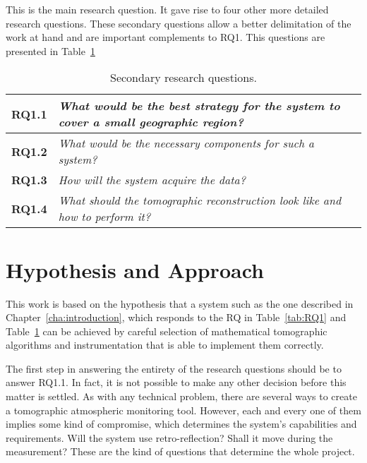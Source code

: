 This is the main research question. It gave rise to four other more
detailed research questions. These secondary questions allow a better
delimitation of the work at hand and are important complements to RQ1.
This questions are presented in Table~\ref{tab:sec_RQ}

\begin{table}[htpb]
    \centering
    \caption{Secondary research questions.}
    \label{tab:sec_RQ}
    \begin{tabularx}{0.8\textwidth}{cX}
        \toprule
        \textbf{RQ1.1}&\emph{ What would be the best strategy
        for the system to cover a small geographic region? }\\
        \midrule
        \textbf{RQ1.2}&\emph{ What would be the necessary
        components for such a system? }\\
        \midrule
        \textbf{RQ1.3}&\emph{ How will the system acquire the
        data? }\\
        \midrule
        \textbf{RQ1.4}&\emph{ What should the tomographic
        reconstruction look like and how to perform it? }\\
        \bottomrule
    \end{tabularx}
\end{table}



\section{Hypothesis and Approach}%
\label{sec:hypothesis_and_approach}

This work is based on the hypothesis that a system such as the one
described in Chapter~\ref{cha:introduction}, which responds to the
\gls{RQ} in Table~\ref{tab:RQ1} and Table~\ref{tab:sec_RQ} can be
achieved by careful selection of mathematical tomographic algorithms and
instrumentation that is able to implement them correctly.

The first step in answering the entirety of the research questions
should be to answer RQ1.1. In fact, it is not possible to make any other
decision before this matter is settled. As with any technical problem,
there are several ways to create a tomographic atmospheric monitoring
tool. However, each and every one of them implies some kind of
compromise, which determines the system's capabilities and requirements.
Will the system use retro-reflection? Shall it move during the
measurement? These are the kind of questions that determine the whole
project.

